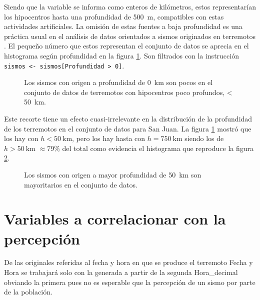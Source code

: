 \documentclass[a4paper]{report}
\begin{document}
Siendo que la variable se informa como enteros de kilómetros, estos representarían los hipocentros hasta una profundidad de \SI{500}{\metre}, compatibles con estas actividades artificiales.
La omisión de estas fuentes a baja profundidad es una práctica usual en el análisis de datos orientados a sismos originados en terremotos \cite{hu_applying_2024}.
El pequeño número que estos representan  el conjunto de datos se aprecia en el histograma según profundidad en la figura \ref{fig:histograma_profundidad50km}.
Son filtrados con la instrucción \verb'sismos <- sismos[Profundidad > 0]'.
\begin{figure}[!ht]
	\centering
	
  \vspace{-1cm} %
	\caption{Los sismos con origen a profundidad de \SI{0}{\kilo\metre} son pocos en el conjunto de datos de terremotos con hipocentros poco profundos, < \SI{50}{\kilo\metre}.}
	\label{fig:histograma_profundidad50km}
\end{figure}

Este recorte tiene un efecto cuasi-irrelevante en la distribución de la profundidad de los terremotos en el conjunto de datos para San Juan. 
La figura \ref{fig:histograma_profundidad50km} mostró que los hay con \(h < \SI{50}{\kilo\metre}\), pero los hay hasta con \(h= \SI{750}{\kilo\metre}\) siendo los de \(h > \SI{50}{\kilo\metre}\) \(\approx 79\%\) del total como evidencia el histograma que reproduce la figura \ref{fig:histograma_profundidad750km}.

\begin{figure}[!ht]
	\centering
	
  \vspace{-1cm} %
	\caption{Los sismos con origen a mayor profundidad de \SI{50}{\kilo\metre} son mayoritarios en el conjunto de datos.}
	\label{fig:histograma_profundidad750km}
\end{figure}




\section{Variables a correlacionar con la percepción}
De las originales referidas al fecha y hora en que se produce el terremoto Fecha y Hora se trabajará solo con la generada a partir de la segunda Hora\_decimal obviando la primera pues no es esperable que la percepción de un sismo por parte de la población.
\end{document}
